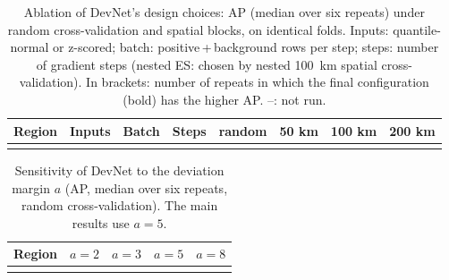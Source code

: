 \documentclass[pdflatex,sn-apa]{sn-jnl}
\begin{document}
\begin{appendices}
\begin{table}[!h]
\caption{Ablation of DevNet's design choices: AP (median over six repeats) under random cross-validation and spatial blocks, on identical folds. Inputs: quantile-normal or z-scored; batch: positive\,+\,background rows per step; steps: number of gradient steps (nested ES: chosen by nested 100~km spatial cross-validation). In brackets: number of repeats in which the final configuration (bold) has the higher AP. --: not run.}\label{tab:ablation}
\scriptsize
\setlength{\tabcolsep}{2.5pt}
\begin{tabular*}{\textwidth}{@{\extracolsep\fill}llllllll}
\toprule
Region & Inputs & Batch & Steps & random & 50 km & 100 km & 200 km \\
\midrule
\botrule
\end{tabular*}
\end{table}

\begin{table}[!h]
\caption{Sensitivity of DevNet to the deviation margin $a$ (AP, median over six repeats, random cross-validation). The main results use $a = 5$.}\label{tab:margin}
\footnotesize
\begin{tabular*}{0.7\textwidth}{@{\extracolsep\fill}lcccc}
\toprule
Region & $a = 2$ & $a = 3$ & $a = 5$ & $a = 8$ \\
\midrule
\botrule
\end{tabular*}
\end{table}

\end{appendices}

\clearpage


\end{document}
